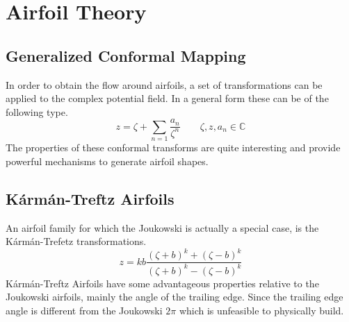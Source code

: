 



\newpage
\chapter{Airfoil Theory}

\section{Generalized Conformal Mapping}
In order to obtain the flow around airfoils, a set of transformations can be applied to the complex potential field.
In a general form these can be of the following type.
\begin{equation}
    \label{general_transform}
    z = \zeta + \sum\limits_{n=1} \frac{a_n}{\zeta^n}  \qquad \zeta, z, a_n \in \mathbb{C}
\end{equation}
The properties of these conformal transforms are quite interesting and provide powerful mechanisms to generate airfoil shapes.

\section{K\'arm\'an-Treftz Airfoils}
An airfoil family for which the Joukowski is actually a special case, is the K\'arm\'an-Trefetz transformations. 
\begin{equation}
    \label{karman_transform}
    z = kb \frac{(\zeta +b)^k + (\zeta -b)^k }{(\zeta +b)^k - (\zeta -b)^k }
\end{equation}
K\'arm\'an-Treftz Airfoils have some advantageous properties relative to the Joukowski airfoils, mainly the angle of the trailing edge. 
Since the trailing edge angle is different from the Joukowski $2\pi$ which is unfeasible to physically build.

